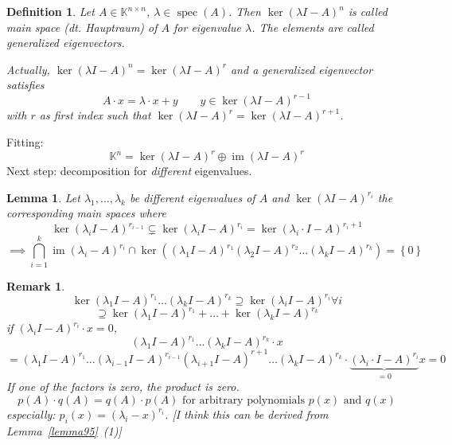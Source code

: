 \documentclass{article}
\newcounter{lecref}[section]
\numberwithin{lecref}{section}
\newtheorem{definition}[lecref]{Definition}
\newtheorem{lemma}[lecref]{Lemma}
\newtheorem{remark}[lecref]{Remark}
\newcommand{\set}[1]{\left\{#1\right\}}
\DeclareMathOperator{\im}{im}
\begin{document}
\begin{definition} %
  Let $A \in \mathbb K^{n\times n}$, $\lambda \in \operatorname{spec}(A)$.
  Then $\ker(\lambda I - A)^n$ is called \emph{main space} (dt. \foreignlanguage{german}{Hauptraum})
  of $A$ for eigenvalue $\lambda$. The elements are called \emph{generalized eigenvectors}.

  Actually, $\ker(\lambda I - A)^n = \ker(\lambda I - A)^r$ and a generalized eigenvector satisfies
  \[ A \cdot x = \lambda \cdot x + y \qquad y \in \ker(\lambda I - A)^{r-1} \]
  with $r$ as first index such that $\ker(\lambda I - A)^r = \ker(\lambda I - A)^{r+1}$.
\end{definition}

Fitting:
\[ \mathbb K^n = \ker(\lambda I - A)^r \oplus \im(\lambda I - A)^r \]
Next step: decomposition for \emph{different} eigenvalues.

\begin{lemma} %
  \label{lemma1111}
  Let $\lambda_1, \dots, \lambda_k$ be different eigenvalues of $A$ and
  $\ker(\lambda I - A)^{r_i}$ the corresponding main spaces where
  \[ \ker(\lambda_i I - A)^{r_{i-1}} \subsetneq \ker(\lambda_i I - A)^{r_i} = \ker(\lambda_i \cdot I - A)^{r_i + 1} \]
  \[ \implies \bigcap_{i=1}^k \im(\lambda_i - A)^{r_i} \cap \ker((\lambda_1 I - A)^{r_1} (\lambda_2 I - A)^{r_2} \dots (\lambda_k I - A)^{r_k}) = \set{0} \]
\end{lemma}

\begin{remark}
  \[ \ker(\lambda_1 I - A)^{r_1} \dots (\lambda_k I - A)^{r_k} \supseteq \ker(\lambda_i I - A)^{r_i} \forall i \]
  \[ \supseteq \ker(\lambda_1 I - A)^{r_1} + \dots + \ker(\lambda_k I - A)^{r_k} \]
  if $(\lambda_i I - A)^{r_i} \cdot x = 0$,
  \[ (\lambda_1 I - A)^{r_1} \dots (\lambda_k I - A)^{r_k} \cdot x \]
  \[ = (\lambda_1 I - A)^{r_1} \dots (\lambda_{i-1} I - A)^{r_{i-1}} (\lambda_{i+1} I - A)^{r+1} \dots (\lambda_k I - A)^{r_k} \cdot \underbrace{(\lambda_i \cdot I - A)^{r_i}}_{=0} x = 0 \]
  If one of the factors is zero, the product is zero.
  \[ p(A) \cdot q(A) = q(A) \cdot p(A) \text{ for arbitrary polynomials } p(x) \text{ and } q(x) \]
  especially: $p_i(x) = (\lambda_i - x)^{r_i}$. [I think this can be derived from Lemma~\ref{lemma95}~(1)]
\end{remark}
\end{document}
